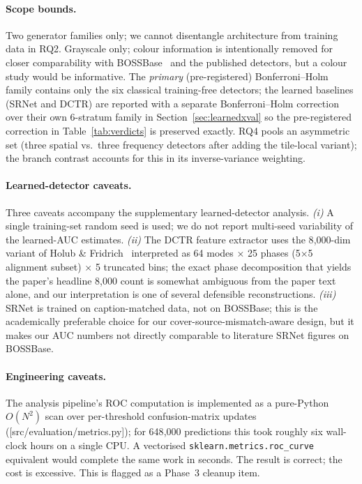 \documentclass[10pt,twocolumn,a4paper]{article}
\begin{document}
\paragraph{Scope bounds.} Two generator families only; we cannot disentangle architecture from training data in RQ2. Grayscale only; colour information is intentionally removed for closer comparability with BOSSBase~\cite{bas2011boss} and the published detectors, but a colour study would be informative. The \emph{primary} (pre-registered) Bonferroni--Holm family contains only the six classical training-free detectors; the learned baselines (SRNet and DCTR) are reported with a separate Bonferroni--Holm correction over their own 6-stratum family in Section~\ref{sec:learnedxval} so the pre-registered correction in Table~\ref{tab:verdicts} is preserved exactly. RQ4 pools an asymmetric set (three spatial vs.\ three frequency detectors after adding the tile-local variant); the branch contrast accounts for this in its inverse-variance weighting.

\paragraph{Learned-detector caveats.} Three caveats accompany the supplementary learned-detector analysis. \textit{(i)} A single training-set random seed is used; we do not report multi-seed variability of the learned-AUC estimates. \textit{(ii)} The DCTR feature extractor uses the 8{,}000-dim variant of Holub \& Fridrich~\cite{holub2015dctr} interpreted as 64 modes $\times$ 25 phases (5$\times$5 alignment subset) $\times$ 5 truncated bins; the exact phase decomposition that yields the paper's headline 8{,}000 count is somewhat ambiguous from the paper text alone, and our interpretation is one of several defensible reconstructions. \textit{(iii)} SRNet is trained on caption-matched data, not on BOSSBase; this is the academically preferable choice for our cover-source-mismatch-aware design, but it makes our AUC numbers not directly comparable to literature SRNet figures on BOSSBase.

\paragraph{Engineering caveats.} The analysis pipeline's ROC computation is implemented as a pure-Python $O(N^2)$ scan over per-threshold confusion-matrix updates ([src/evaluation/metrics.py]); for 648{,}000 predictions this took roughly six wall-clock hours on a single CPU. A vectorised \texttt{sklearn.metrics.roc\_curve} equivalent would complete the same work in seconds. The result is correct; the cost is excessive. This is flagged as a Phase~3 cleanup item.
\end{document}
